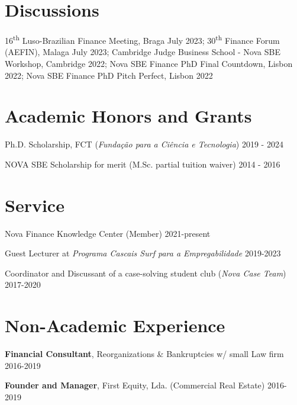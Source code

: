 \documentclass[letterpaper]{article}
\newenvironment{itemize*}{
  \begin{list}{}{
    \setlength{\leftmargin}{1.5em}
  }
}{
  \end{list}
}
\begin{document}
\section*{Discussions}
\begin{itemize*}
\item 16\textsuperscript{th}  Luso-Brazilian Finance Meeting, Braga July 2023; 30\textsuperscript{th} Finance Forum (AEFIN), Malaga July 2023; Cambridge Judge Business School - Nova SBE Workshop,  Cambridge 2022; Nova SBE Finance PhD Final Countdown, Lisbon 2022; Nova SBE Finance PhD Pitch Perfect, Lisbon 2022
\end{itemize*}

\section*{Academic Honors and Grants}

\begin{itemize*}
\item Ph.D. Scholarship, FCT (\textit{Fundação para a Ciência e Tecnologia}) \hfill 2019 - 2024
\item NOVA SBE Scholarship for merit (M.Sc. partial tuition waiver) \hfill 2014 - 2016
\end{itemize*}

\section*{Service}
\begin{itemize*}
\item Nova Finance Knowledge Center (Member) \hfill 2021-present
\item Guest Lecturer at \textit{Programa Cascais Surf para a Empregabilidade} \hfill 2019-2023
\item Coordinator and Discussant of a case-solving student club (\textit{Nova Case Team}) \hfill 2017-2020
\end{itemize*}

\section*{Non-Academic Experience}

\begin{itemize*}
\item \textbf{Financial Consultant}, Reorganizations \& Bankruptcies w/ small Law firm \hfill 2016-2019
\item \textbf{Founder and Manager}, First Equity, Lda. (Commercial Real Estate) \hfill 2016-2019
\end{itemize*}
\end{document}

